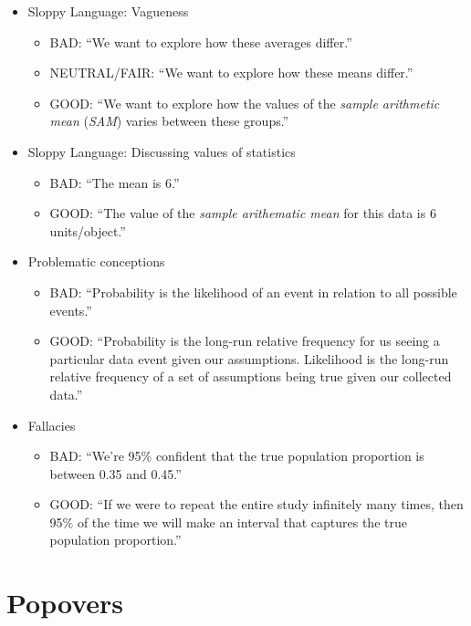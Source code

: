 \documentclass[
]{book}
\providecommand{\tightlist}{%
  \setlength{\itemsep}{0pt}\setlength{\parskip}{0pt}}
\begin{document}
\begin{itemize}
\tightlist
\item
  Sloppy Language: Vagueness

  \begin{itemize}
  \tightlist
  \item
    BAD: ``We want to explore how these averages differ.''
  \item
    NEUTRAL/FAIR: ``We want to explore how these means differ.''
  \item
    GOOD: ``We want to explore how the values of the \emph{sample arithmetic mean} (\emph{SAM}) varies between these groups.''
  \end{itemize}
\item
  Sloppy Language: Discussing values of statistics

  \begin{itemize}
  \tightlist
  \item
    BAD: ``The mean is 6.''
  \item
    GOOD: ``The value of the \emph{sample arithematic mean} for this data is 6 units/object.''
  \end{itemize}
\item
  Problematic conceptions

  \begin{itemize}
  \tightlist
  \item
    BAD: ``Probability is the likelihood of an event in relation to all possible events.''
  \item
    GOOD: ``Probability is the long-run relative frequency for us seeing a particular data event given our assumptions. Likelihood is the long-run relative frequency of a set of assumptions being true given our collected data.''
  \end{itemize}
\item
  Fallacies

  \begin{itemize}
  \tightlist
  \item
    BAD: ``We're 95\% confident that the true population proportion is between 0.35 and 0.45.''
  \item
    GOOD: ``If we were to repeat the entire study infinitely many times, then 95\% of the time we will make an interval that captures the true population proportion.''
  \end{itemize}
\end{itemize}

\hypertarget{popovers}{%
\section{Popovers}\label{popovers}}
\end{document}
